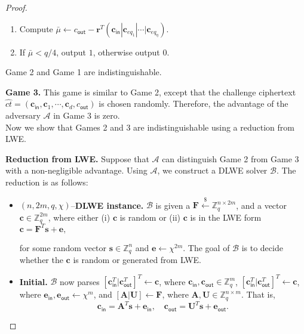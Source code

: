 \documentclass[runningheads,10pt]{llncs}
\begin{document}
\begin{proof}
\begin{description}
\begin{enumerate}
\begin{enumerate}
				\item Compute $\bar{\mu} \leftarrow c_{\textsf{out}}-\textbf{r}^T(\textbf{c}_\textsf{in}|\textbf{c}_{eq_{1}}|\cdots|\textbf{c}_{eq_\eta})$.
				\item If $ \bar{\mu}  <q/4$, output $1$, otherwise output $0$.
				
			\end{enumerate}
			\fi
			
		\end{enumerate}
		Game 2 and Game 1 are indistinguishable.
		
		\item  \textbf{Game 3.} This game is similar to Game 2, 
		except that the challenge ciphertext $\widehat{ct}=(\textbf{c}_{\textsf{in}}, \textbf{c}_1, \cdots, \textbf{c}_{d}, c_{\textsf{out}})$ is chosen randomly. 
		Therefore, the advantage of the adversary $\mathcal{A}$ in Game 3 is zero.\\
		Now we show that Games 2 and 3 are indistinguishable using a reduction from LWE.
		
		
		\item \textbf{Reduction from LWE.} Suppose that $\mathcal{A}$ can distinguish Game 2 from Game 3 
		with a non-negligible advantage. 
		Using $\mathcal{A}$, we construct a DLWE solver $\mathcal{B}$. The reduction is as follows:
		\begin{itemize}
			\item $(n,2m,q,\chi)$--\textbf{DLWE instance.} $\mathcal{B}$ is given a
			$\textbf{F} \xleftarrow{\$}\mathbb{Z}_q^{n \times 2m}$, and a vector $\mathbf{c}\in \mathbb{Z}_q^{2m}$,
			where  either (i) $\textbf{c}$ is random or 
			(ii) $\textbf{c}$ is in the LWE form
			$\textbf{c}=\textbf{F}^T \textbf{s}+\textbf{e},$
			
			for some random vector $\textbf{s}\in \mathbb{Z}_q^{n}$ and $\textbf{e} \leftarrow \chi^{2m}$. 
			The goal of $\mathcal{B}$ is to decide whether the $\textbf{c}$ is random or generated from LWE.
				 
			\item \textbf{Initial.} $\mathcal{B}$ now parses   $[\mathbf{c}_{\textsf{in}}^T|\mathbf{c}_{\textsf{out}}^T]^T \leftarrow \mathbf{c}$, where $\mathbf{c}_{\textsf{in}}, \mathbf{c}_{\textsf{out}}\in \mathbb{Z}_q^{m}$, $[\mathbf{c}_{\textsf{in}}^T|\mathbf{c}_{\textsf{out}}^T]^T \leftarrow \mathbf{c}$, where $\mathbf{e}_{\textsf{in}}, \mathbf{e}_{\textsf{out}}\leftarrow \chi^{m}$, and  $[\mathbf{A} |\mathbf{U}] \leftarrow \mathbf{F}$, where $\mathbf{A}, \textbf{U}\in \mathbb{Z}_q^{n \times m}$. That is,
			\begin{equation}\label{key89}
			\textbf{c}_{\textsf{in}}=\textbf{A}^T \textbf{s}+\textbf{e}_{\textsf{in}},	 \quad \textbf{c}_{\textsf{out}}=\textbf{U}^T \textbf{s}+\textbf{e}_{\textsf{out}}.
		\end{equation}
			

\end{itemize}
\end{description}
\end{proof}
\end{document}
